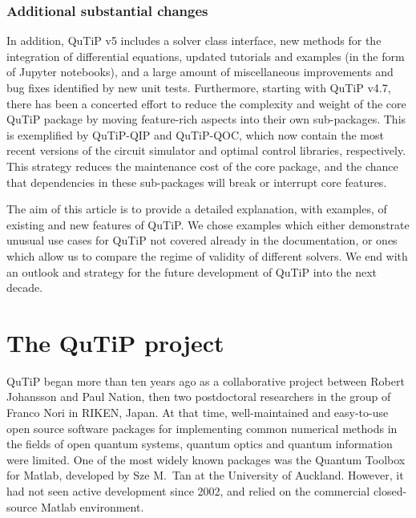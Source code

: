 \documentclass[preprint,3p,sort&compress]{elsarticle}
\begin{document}
\subsubsection{Additional substantial changes}
In addition, QuTiP v5 includes a solver class interface, new methods for the integration of differential equations, updated tutorials and examples (in the form of Jupyter notebooks), and a large amount of miscellaneous improvements and bug fixes identified by new unit tests.  
Furthermore, starting with QuTiP v4.7, there has been a concerted effort to reduce the complexity and weight of the core QuTiP package by moving feature-rich aspects into their own sub-packages. This is exemplified by QuTiP-QIP and QuTiP-QOC, which now contain the most recent versions of the circuit simulator and optimal control libraries, respectively. This strategy reduces the maintenance cost of the core package, and the chance that dependencies in these sub-packages will break or interrupt core features.

The aim of this article is to provide a detailed explanation, with examples, of existing and new features of QuTiP. We chose examples which either demonstrate unusual use cases for QuTiP not covered already in the documentation, or ones which allow us to compare the regime of validity of different solvers. We end with an outlook and strategy for the future development of QuTiP into the next decade.




\section{The QuTiP project} \label{sec:history}

QuTiP began more than ten years ago as a collaborative project between Robert Johansson and Paul Nation, then two postdoctoral researchers in the group of Franco Nori in RIKEN, Japan. At that time, well-maintained and easy-to-use open source software packages for implementing common numerical methods in the fields of open quantum systems, quantum optics and quantum information were limited. One of the most widely known packages was the Quantum Toolbox for Matlab, developed by Sze M.\ Tan at the University of Auckland.  However, it had not seen active development since 2002, and relied on the commercial closed-source Matlab environment.
\end{document}
